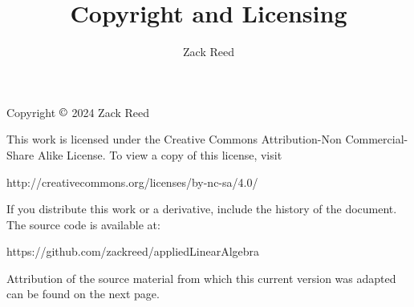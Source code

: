 \documentclass{ximera}
\author{Zack Reed}
\title{Copyright and Licensing}
\begin{document}
\begin{abstract}

\end{abstract}
\maketitle

Copyright $\copyright$ 2024 Zack Reed

This work is licensed under the Creative Commons Attribution-Non Commercial-Share Alike License. To view a copy of this license,
visit 

http://creativecommons.org/licenses/by-nc-sa/4.0/

If you distribute this work or a derivative, include the history of the document. The source code is available at: 

https://github.com/zackreed/appliedLinearAlgebra

Attribution of the source material from which this current version was adapted can be found on the next page.
\end{document}
